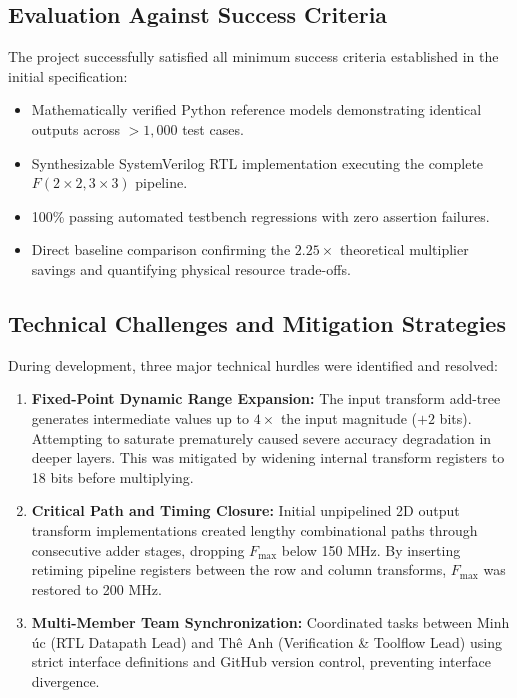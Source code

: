\documentclass[12pt,a4paper]{article}
\begin{document}
\subsection{Evaluation Against Success Criteria}
The project successfully satisfied all minimum success criteria established in the initial specification:
\begin{itemize}
    \item Mathematically verified Python reference models demonstrating identical outputs across $>1,000$ test cases.
    \item Synthesizable SystemVerilog RTL implementation executing the complete $F(2 \times 2, 3 \times 3)$ pipeline.
    \item 100\% passing automated testbench regressions with zero assertion failures.
    \item Direct baseline comparison confirming the $2.25\times$ theoretical multiplier savings and quantifying physical resource trade-offs.
\end{itemize}

\subsection{Technical Challenges and Mitigation Strategies}
During development, three major technical hurdles were identified and resolved:
\begin{enumerate}
    \item \textbf{Fixed-Point Dynamic Range Expansion:} The input transform add-tree generates intermediate values up to $4\times$ the input magnitude ($+2$ bits). Attempting to saturate prematurely caused severe accuracy degradation in deeper layers. This was mitigated by widening internal transform registers to 18 bits before multiplying.
    \item \textbf{Critical Path and Timing Closure:} Initial unpipelined 2D output transform implementations created lengthy combinational paths through consecutive adder stages, dropping $F_{\max}$ below 150 MHz. By inserting retiming pipeline registers between the row and column transforms, $F_{\max}$ was restored to 200 MHz.
    \item \textbf{Multi-Member Team Synchronization:} Coordinated tasks between Minh \DJ{}\'{u}c (RTL Datapath Lead) and Th\^{e} Anh (Verification \& Toolflow Lead) using strict interface definitions and GitHub version control, preventing interface divergence.
\end{enumerate}

\end{document}
